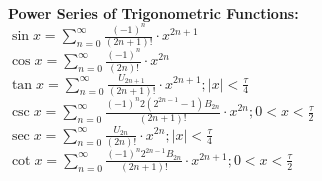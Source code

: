 \\ \begin{minipage}{\textwidth}
    \textbf{Power Series of Trigonometric Functions: }
    \\ \( \sin x = \displaystyle\sum_{n = 0}^{\infty} { \displaystyle\frac{ ( -1 )^n }{ ( 2n + 1 )! } \cdot x^{2n + 1} } \)
    \\ \( \cos x = \displaystyle\sum_{n = 0}^{\infty} { \displaystyle\frac{ ( -1 )^n }{ (2n)! } \cdot x^{2n} } \)
    \\ \( \tan x = \displaystyle\sum_{n = 0}^{\infty} { \displaystyle\frac{ U_{2n + 1} }{ ( 2n + 1 )! } \cdot x^{2n + 1} } ;  | x | < \displaystyle\frac{ \tau }{ 4 } \)
    \\ \( \csc x = \displaystyle\sum_{n = 0}^{\infty} { \displaystyle\frac{ ( -1 )^n 2( 2^{2n - 1} - 1 ) B_{2n} }{ ( 2n + 1 )! } \cdot x^{2n} } ; 0 < x < \displaystyle\frac{ \tau }{ 2 } \)
    \\ \( \sec x = \displaystyle\sum_{n = 0}^{\infty} { \displaystyle\frac{ U_{2n} }{ ( 2n )! } \cdot x^{2n} } ; | x | < \displaystyle\frac{ \tau }{ 4 } \)
    \\ \( \cot x = \displaystyle\sum_{n = 0}^{\infty} { \displaystyle\frac{ ( -1 )^n 2^{2n - 1} B_{2n} }{ ( 2n + 1 )! } \cdot x^{2n + 1} } ; 0 < x < \displaystyle\frac{ \tau }{ 2 } \)
\end{minipage}